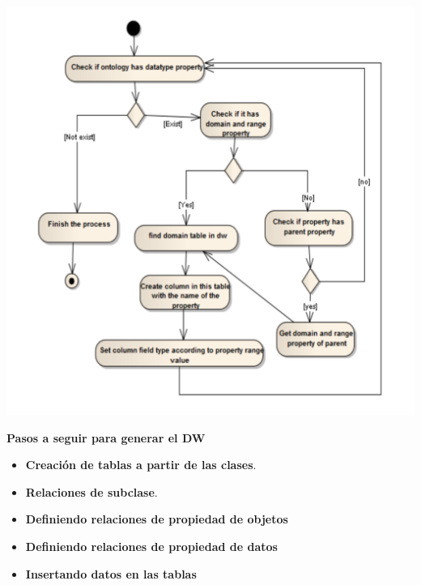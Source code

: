 \documentclass{fancyslides}
\begin{document}
\begin{frame}
\misc
{
\begin{center}
\includegraphics[scale=0.18]{data_property}
\end{center}
}
\end{frame}


\begin{frame}
\misc
{ \textbf{\Large Pasos a seguir para generar el DW}
\newline
\newline

\begin{itemize}
  \item \textbf{Creación de tablas a partir de las clases}.
  \item \textbf{Relaciones de subclase}.
  \item \textbf{Definiendo relaciones de propiedad de objetos}
  \item \textbf{Definiendo relaciones de propiedad de datos}
  \item \textbf{Insertando datos en las tablas}
\end{itemize}

}
\end{frame}
\end{document}
